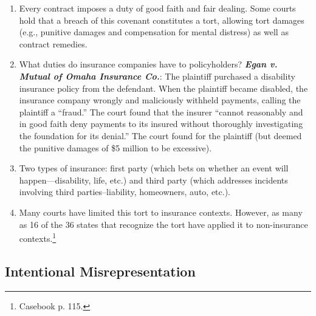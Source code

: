 \begin{enumerate}
    \item Every contract imposes a duty of good faith and fair dealing. Some 
    courts hold that a breach of this covenant constitutes a tort, allowing 
    tort damages (e.g., punitive damages and compensation for mental distress) 
    as well as contract remedies.
    \item What duties do insurance companies have to policyholders? 
    \textbf{\emph{Egan v. Mutual of Omaha Insurance Co.}}: The plaintiff 
    purchased a disability insurance policy from the defendant. When the 
    plaintiff became disabled, the insurance company wrongly and maliciously 
    withheld payments, calling the plaintiff a ``fraud.'' The court found that 
    the insurer ``cannot reasonably and in good faith deny payments to its 
    insured without thoroughly investigating the foundation for its denial.'' 
    The court found for the plaintiff (but deemed the punitive damages of \$5 
    million to be excessive).
    \item Two types of insurance: first party (which bets on whether an event 
    will happen---disability, life, etc.) and third party (which addresses 
    incidents involving third parties--liability, homeowners, auto, etc.).
    \item Many courts have limited this tort to insurance contexts. However, 
    as many as 16 of the 36 states that recognize the tort have applied it to 
    non-insurance contexts.\footnote{Casebook p. 115.}
\end{enumerate}

\subsection{Intentional Misrepresentation}

